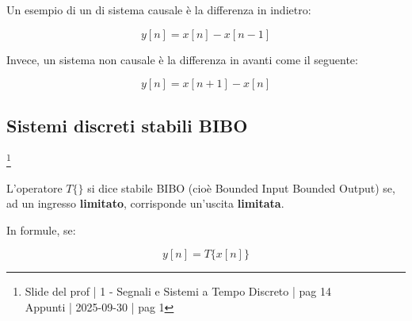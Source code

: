 Un esempio di un di sistema causale è la differenza in indietro: 

{
    \Large 
    \begin{equation}
        y \left[ n\right] 
        = 
        x \left[n\right]
        - 
        x \left[n - 1\right]
    \end{equation}
}

Invece, un sistema non causale è la differenza in avanti come il seguente: 

{
    \Large 
    \begin{equation}
        y \left[ n\right] 
        = 
        x \left[n + 1\right]
        - 
        x \left[n \right]
    \end{equation}
}

\newpage 

\subsection{Sistemi discreti stabili BIBO}

\footnote{ 
    Slide del prof | 1 - Segnali e Sistemi a Tempo Discreto | pag 14\\
    Appunti | 2025-09-30 | pag 1
}

L'operatore $T \{ \}$ si dice stabile BIBO (cioè Bounded Input Bounded Output) 
se, ad un ingresso \textbf{limitato}, corrisponde un'uscita \textbf{limitata}. \newline 

In formule, se: 

{
    \Large 
    \begin{equation}
        y \left[ n \right]
        = 
        T \{ x \left[ n\right]\}
    \end{equation}
}

